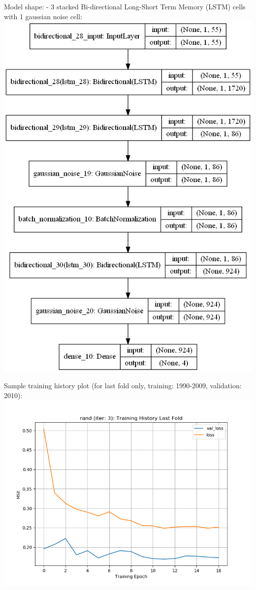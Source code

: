 \documentclass[11pt]{article}
\makeatletter
\def\maxwidth{\ifdim\Gin@nat@width>\linewidth\linewidth
    \else\Gin@nat@width\fi}
\let\Oldincludegraphics\includegraphics
\renewcommand{\includegraphics}[1]{\Oldincludegraphics[width=.8\maxwidth]{#1}}
\makeatother
\begin{document}
    Model shape: - 3 stacked Bi-directional Long-Short Term Memory (LSTM)
cells with 1 gaussian noise cell:
\includegraphics{runs/2gpuRand4stationsNarx1/foundModels/randModelIter3.png}

    Sample training history plot (for last fold only, training: 1990-2009,
validation: 2010):
\includegraphics{runs/2gpuRand4stationsNarx1/foundModels/randIter3History.png}
\end{document}
